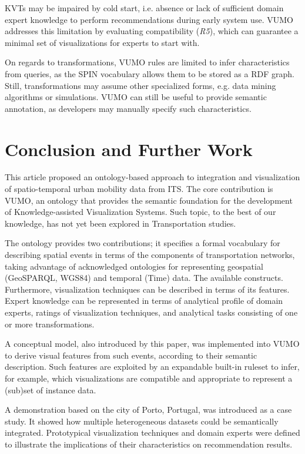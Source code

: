 \documentclass[]{interact}
\theoremstyle{plain}%
\theoremstyle{definition}
\theoremstyle{remark}
\theoremstyle{definition}
\begin{document}
KVTs may be impaired by cold start, i.e. absence or lack of sufficient domain expert knowledge to perform recommendations during early system use. VUMO addresses this limitation by evaluating compatibility (\textit{R5}), which can guarantee a minimal set of visualizations for experts to start with.

On regards to transformations, VUMO rules are limited to infer characteristics from queries, as the SPIN vocabulary allows them to be stored as a RDF graph. Still, transformations may assume other specialized forms, e.g. data mining algorithms or simulations. VUMO can still be useful to provide semantic annotation, as developers may manually specify such characteristics.


\section{Conclusion and Further Work}
\label{sec:conclusion}

This article proposed an ontology-based approach to integration and visualization of spatio-temporal urban mobility data from ITS. The core contribution is VUMO, an ontology that provides the semantic foundation for the development of Knowledge-assisted Visualization Systems. Such topic, to the best of our knowledge, has not yet been explored in Transportation studies.

The ontology provides two contributions; it specifies a formal vocabulary for describing spatial events in terms of the components of transportation networks, taking advantage of acknowledged ontologies for representing geospatial (GeoSPARQL, WGS84) and temporal (Time) data. The available constructs. Furthermore, visualization techniques can be described in terms of its features. Expert knowledge can be represented in terms of analytical profile of domain experts, ratings of visualization techniques, and analytical tasks consisting of one or more transformations.

A conceptual model, also introduced by this paper, was implemented into VUMO to derive visual features from such events, according to their semantic description. Such features are exploited by an expandable built-in ruleset to infer, for example, which visualizations are compatible and appropriate to represent a (sub)set of instance data.

A demonstration based on the city of Porto, Portugal, was introduced as a case study. It showed how multiple heterogeneous datasets could be semantically integrated. Prototypical visualization techniques and domain experts were defined to illustrate the implications of their characteristics on recommendation results.
\end{document}
